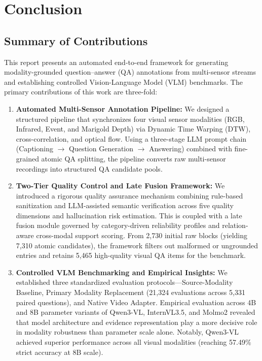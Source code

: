 
\chapter{Conclusion}
\label{ch:conclusion}


\section{Summary of Contributions}
\label{sec:conclusion_contributions}

This report presents an automated end-to-end framework for generating
modality-grounded question--answer (QA) annotations from multi-sensor streams
and establishing controlled Vision-Language Model (VLM) benchmarks. The primary
contributions of this work are three-fold:

\begin{enumerate}
    \item \textbf{Automated Multi-Sensor Annotation Pipeline:} We designed a
          structured pipeline that synchronizes four visual sensor modalities (RGB,
          Infrared, Event, and Marigold Depth) via Dynamic Time Warping (DTW),
          cross-correlation, and optical flow. Using a three-stage LLM prompt chain (Captioning $\rightarrow$
          Question Generation $\rightarrow$ Answering) combined with fine-grained
          atomic QA splitting, the pipeline converts raw multi-sensor recordings into
          structured QA candidate pools.

    \item \textbf{Two-Tier Quality Control and Late Fusion Framework:} We introduced
          a rigorous quality assurance mechanism combining rule-based sanitization
          and LLM-assisted semantic verification across five quality dimensions and
          hallucination risk estimation. This is coupled with a late fusion module
          governed by category-driven reliability profiles and relation-aware
          cross-modal support scoring. From 2,730 initial raw blocks (yielding 7,310
          atomic candidates), the framework filters out malformed or ungrounded entries
          and retains 5,465 high-quality visual QA items for the benchmark.

    \item \textbf{Controlled VLM Benchmarking and Empirical Insights:} We established
          three standardized evaluation protocols—Source-Modality Baseline, Primary
          Modality Replacement (21,324 evaluations across 5,331 paired questions), and
          Native Video Adapter. Empirical evaluation across 4B and 8B parameter
          variants of Qwen3-VL, InternVL3.5, and Molmo2 revealed that model architecture
          and evidence representation play a more decisive role in modality robustness
          than parameter scale alone. Notably, Qwen3-VL achieved superior performance
          across all visual modalities (reaching 57.49\% strict accuracy at 8B scale).
\end{enumerate}

